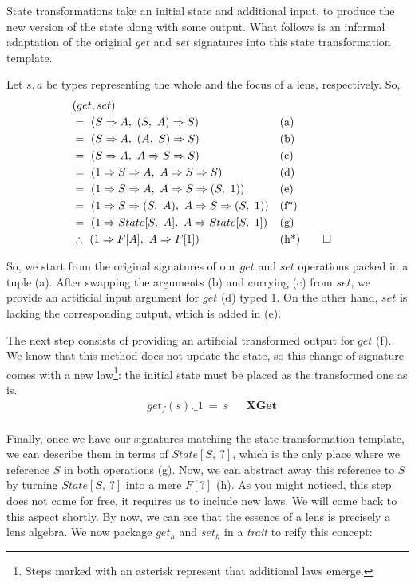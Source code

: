 \documentclass[final, twocolumn, 3p]{elsarticle}
\begin{document}
State transformations take an initial state and additional input, to produce the
new version of the state along with some output. What follows is an informal
adaptation of the original $get$ and $set$ signatures into this state
transformation template.

\begin{remark}
  Let $s, a$ be types representing the whole and the focus of a lens,
  respectively. So,
  \begin{align*}
    &  (get, set) \\
    &=\ (S \Rightarrow A,\ (S,\ A) \Rightarrow S) &&\text{(a)} \\
    &=\ (S \Rightarrow A,\ (A,\ S) \Rightarrow S) &&\text{(b)} \\
    &=\ (S \Rightarrow A,\ A \Rightarrow S \Rightarrow S) &&\text{(c)} \\
    &=\ (1 \Rightarrow S \Rightarrow A,\ A \Rightarrow S \Rightarrow S) &&\text{(d)} \\
    &=\ (1 \Rightarrow S \Rightarrow A,\ A \Rightarrow S \Rightarrow (S,\ 1)) &&\text{(e)} \\
    &=\ (1 \Rightarrow S \Rightarrow (S,\ A),\ A \Rightarrow S \Rightarrow (S,\ 1)) &&\text{(f*)} \\
    &=\ (1 \Rightarrow State[S,\ A],\ A \Rightarrow State[S,\ 1]) &&\text{(g)} \\
    &\therefore\ (1 \Rightarrow F[A],\ A \Rightarrow F[1]) &&\text{(h*)}\qedhere
  \end{align*}
\end{remark}

So, we start from the original signatures of our $get$ and $set$ operations
packed in a tuple (a). After swapping the arguments (b) and currying (c) from
$set$, we provide an artificial input argument for $get$ (d) typed $1$. On the
other hand, $set$ is lacking the corresponding output, which is added in (e).

The next step consists of providing an artificial transformed output for $get$
(f). We know that this method does not update the state, so this change of
signature comes with a new law\footnote{Steps marked with an asterisk represent
that additional laws emerge.}: the initial state must be placed as the
transformed one as is.
\begin{align*}
  & get_f(s).\_1\ =\ s &&\textbf{XGet} \\
\end{align*}

Finally, once we have our signatures matching the state transformation template,
we can describe them in terms of $State[S,\ ?]$, which is the only place where
we reference $S$ in both operations (g). Now, we can abstract away this
reference to $S$ by turning $State[S,\ ?]$ into a mere $F[?]$ (h). As you might
noticed, this step does not come for free, it requires us to include new laws.
We will come back to this aspect shortly. By now, we can see that the essence of
a lens is precisely a lens algebra. We now package $get_h$ and $set_h$ in a
\emph{trait} to reify this concept:
\end{document}
